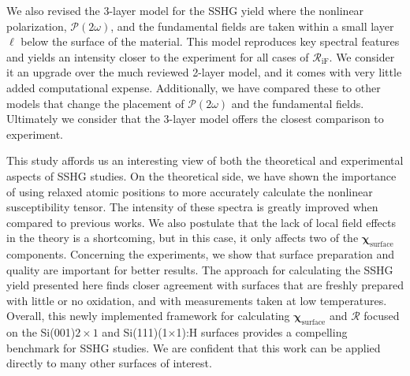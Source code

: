 We also revised the 3-layer model for the SSHG yield where the nonlinear
polarization, $\boldsymbol{\mathcal{P}}(2\omega)$, and the fundamental fields
are taken within a small layer $\ell$ below the surface of the material. This
model reproduces key spectral features and yields an intensity closer to the
experiment for all cases of $\mathcal{R}_{\mathrm{iF}}$. We consider it an
upgrade over the much reviewed 2-layer model\cite{mizrahiJOSA88}, and it comes
with very little added computational expense. Additionally, we have compared
these to other models that change the placement of
$\boldsymbol{\mathcal{P}}(2\omega)$ and the fundamental fields. Ultimately we
consider that the 3-layer model offers the closest comparison to experiment.

This study affords us an interesting view of both the theoretical and
experimental aspects of SSHG studies. On the theoretical side, we have shown the
importance of using relaxed atomic positions to more accurately calculate the
nonlinear susceptibility tensor. The intensity of these spectra is greatly
improved when compared to previous works.\cite{mejiaPRB02} We also postulate
that the lack of local field effects in the theory is a shortcoming, but in this
case, it only affects two of the $\boldsymbol{\chi}_{\mathrm{surface}}$
components. Concerning the experiments, we show that surface preparation and
quality are important for better results. The approach for calculating the SSHG
yield presented here finds closer agreement with surfaces that are freshly
prepared with little or no oxidation, and with measurements taken at low
temperatures. Overall, this newly implemented framework for calculating
$\boldsymbol{\chi}_{\mathrm{surface}}$ and $\mathcal{R}$ focused on the
Si(001)$2\times 1$ and  Si(111)(1$\times$1):H surfaces provides a compelling
benchmark for SSHG studies. We are confident that this work can be applied
directly to many other surfaces of interest.

\stopcontents[chapters]
